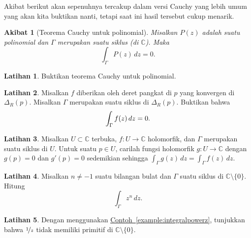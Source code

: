 \documentclass[12pt,openany]{book}
\newcommand{\avoidbreak}{\postdisplaypenalty=100}
\newcommand{\C}{{\mathbb{C}}}
\theoremstyle{plain}
\newtheorem{cor}[thm]{Akibat}
\theoremstyle{remark}
\theoremstyle{definition}
\newenvironment{exbox}{%
    \def\FrameCommand{\vrule width 1pt \relax\hspace{10pt}}%
    \MakeFramed{\advance\hsize-\width\FrameRestore}%
}{%
    \endMakeFramed
}
\theoremstyle{exercise}
\newtheorem{exercise}{Latihan}[section]
\theoremstyle{example}
\newcommand{\exerciseref}[1]{\hyperref[#1]{Latihan~\ref*{#1}}}
\newcommand{\exampleref}[1]{\hyperref[#1]{Contoh~\ref*{#1}}}
\begin{document}
Akibat berikut akan sepenuhnya
tercakup dalam versi Cauchy yang lebih umum yang akan kita buktikan nanti,
tetapi saat ini hasil tersebut cukup menarik.

\begin{cor}[Teorema Cauchy untuk polinomial] \label{cor:cauchyforpoly}
%
Misalkan $P(z)$ adalah suatu polinomial dan $\Gamma$ merupakan
suatu siklus (di $\C$).
Maka
\begin{equation*}
\int_\Gamma P(z) \, dz = 0 .
\end{equation*}
\end{cor}

\begin{exbox}
\begin{exercise}
Buktikan teorema Cauchy untuk polinomial.
\end{exercise}

\begin{exercise}
Misalkan $f$ diberikan oleh deret pangkat di $p$ yang konvergen di $\Delta_R(p)$.  Misalkan
$\Gamma$ merupakan suatu siklus di $\Delta_R(p)$.  Buktikan bahwa
\begin{equation*}
\int_\Gamma f(z) \, dz = 0 .
\avoidbreak
\end{equation*}
\end{exercise}

\begin{exercise}
Misalkan $U \subset \C$ terbuka, $f \colon U \to \C$ holomorfik, dan
$\Gamma$ merupakan suatu siklus di $U$.  
Untuk suatu $p \in U$, carilah fungsi holomorfik $g \colon U \to \C$ dengan $g(p) = 0$
dan $g'(p) = 0$ sedemikian sehingga $\int_\Gamma g(z)\, dz = \int_\Gamma f(z) \, dz$.
\end{exercise}

\begin{exercise}
Misalkan $n \neq -1$ suatu bilangan bulat dan $\Gamma$ suatu siklus di $\C \setminus \{ 0 \}$.
Hitung
\begin{equation*}
\int_\Gamma z^n \, dz .
\end{equation*}
\end{exercise}

\begin{exercise}
Dengan menggunakan \exampleref{example:integralpowerz}, tunjukkan bahwa $\nicefrac{1}{z}$
tidak memiliki primitif di $\C \setminus \{ 0 \}$.
\end{exercise}
\end{exbox}
\end{document}

